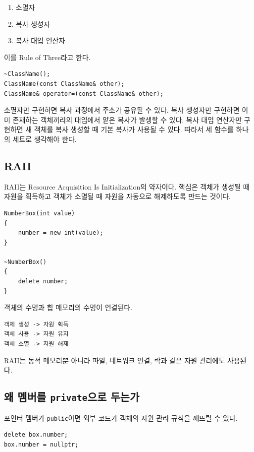 \documentclass[11pt,a4paper]{article}
\begin{document}
\begin{enumerate}[leftmargin=2em]
    \item 소멸자
    \item 복사 생성자
    \item 복사 대입 연산자
\end{enumerate}

이를 Rule of Three라고 한다.

\begin{lstlisting}
~ClassName();
ClassName(const ClassName& other);
ClassName& operator=(const ClassName& other);
\end{lstlisting}

소멸자만 구현하면 복사 과정에서 주소가 공유될 수 있다. 복사 생성자만 구현하면 이미 존재하는 객체끼리의 대입에서 얕은 복사가 발생할 수 있다. 복사 대입 연산자만 구현하면 새 객체를 복사 생성할 때 기본 복사가 사용될 수 있다. 따라서 세 함수를 하나의 세트로 생각해야 한다.

\subsection{RAII}
RAII는 Resource Acquisition Is Initialization의 약자이다. 핵심은 객체가 생성될 때 자원을 획득하고 객체가 소멸될 때 자원을 자동으로 해제하도록 만드는 것이다.

\begin{lstlisting}
NumberBox(int value)
{
    number = new int(value);
}

~NumberBox()
{
    delete number;
}
\end{lstlisting}

객체의 수명과 힙 메모리의 수명이 연결된다.

\begin{verbatim}
객체 생성 -> 자원 획득
객체 사용 -> 자원 유지
객체 소멸 -> 자원 해제
\end{verbatim}

RAII는 동적 메모리뿐 아니라 파일, 네트워크 연결, 락과 같은 자원 관리에도 사용된다.

\subsection{왜 멤버를 \texttt{private}으로 두는가}
포인터 멤버가 \texttt{public}이면 외부 코드가 객체의 자원 관리 규칙을 깨뜨릴 수 있다.

\begin{lstlisting}
delete box.number;
box.number = nullptr;
\end{lstlisting}
\end{document}

